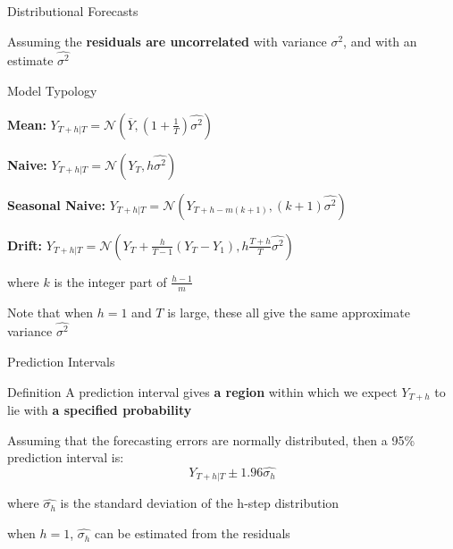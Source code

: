 \documentclass{beamer}
\newenvironment{wideitemize}{\itemize\addtolength{\itemsep}{10pt}}{\enditemize}
\begin{document}
\begin{frame}{Distributional Forecasts}

  Assuming the \textbf{residuals are uncorrelated} with variance $\sigma^2$, and with an estimate $\hat{\sigma^2}$

  \begin{alertblock}{Model Typology}
    \begin{wideitemize}
      \item \textbf{Mean:} $Y_{T+h|T} = \mathcal{N}(\overline{Y}, (1+\frac{1}{T})\hat{\sigma^2})$
      \item \textbf{Naive:} $Y_{T+h|T} = \mathcal{N}(Y_T, h\hat{\sigma^2})$
      \item \textbf{Seasonal Naive:} $Y_{T+h|T} = \mathcal{N}(Y_{T+h-m(k+1)}, (k+1)\hat{\sigma^2})$
      \item \textbf{Drift:} $Y_{T+h|T} = \mathcal{N}(Y_{T} +\frac{h}{T-1}(Y_T - Y_1), h\frac{T+h}{T}\hat{\sigma^2})$
    \end{wideitemize}
  \end{alertblock}

\medskip

\begin{wideitemize}
  \item where $k$ is the integer part of $\frac{h-1}{m}$
  \item Note that when $h=1$ and $T$ is large, these all give the same approximate variance $\hat{\sigma^2}$
\end{wideitemize}

\end{frame}



\begin{frame}{Prediction Intervals}
  \begin{block}{Definition}
      A prediction interval gives \textbf{a region} within which we expect $Y_{T+h}$ to lie with \textbf{a specified probability}
  \end{block}

\medskip
  
  \begin{wideitemize}
  \item Assuming that the forecasting errors are normally distributed, then a 95\% prediction interval is:
    \begin{equation*}
      Y_{T+h|T} \pm 1.96 \hat{\sigma_h}
    \end{equation*}
  \item where $\hat{\sigma_h}$ is the standard deviation of the h-step distribution
  \item when $h=1$, $\hat{\sigma_h}$ can be estimated from the residuals  
  \end{wideitemize}  
\end{frame}
\end{document}
